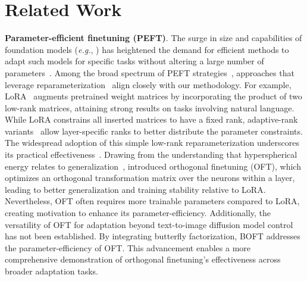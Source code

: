 \section{Related Work}

\textbf{Parameter-efficient finetuning (PEFT)}. The surge in size and capabilities of foundation models (\emph{e.g.}, \cite{brown2020language,radford2021learning,rombach2022high,kirillov2023segment}) has heightened the demand for efficient methods to adapt such models for specific tasks without altering a large number of parameters~\cite{treviso2023efficient,ding2023parameter,lialin2023scaling}. Among the broad spectrum of PEFT strategies~\cite{houlsby2019parameter,aghajanyan2020intrinsic,hulora2022,edalati2022krona,wang2022adamix,gheini2021cross,zaken2022bitfit,guo2020parameter,sung2021training,ansell2022composable,lester2021power,li2021prefix,vu2022spot,he2021towards,mao2021unipelt,karimi2021compacter,liu2022few,sung2022lst,chen2022parameter,jia2022visual,chen2022adaptformer,zhang2022neural,jie2023fact,lian2022scaling,luo2023towards}, approaches that leverage reparameterization~\cite{aghajanyan2020intrinsic,hulora2022,edalati2022krona} align closely with our methodology. For example, LoRA~\cite{hulora2022} augments pretrained weight matrices by incorporating the product of two low-rank matrices, attaining strong results on tasks involving natural language. While LoRA constrains all inserted matrices to have a fixed rank, adaptive-rank variants~\cite{zhang2022adaptive,valipour2022dylora,zhang2023increlora} allow layer-specific ranks to better distribute the parameter constraints. The widespread adoption of this simple low-rank reparameterization underscores its practical effectiveness~\cite{dettmers2023qlora,zi2023delta,chavan2023one}. Drawing from the understanding that hyperspherical energy relates to generalization~\cite{liu2018learning,liu2021orthogonal}, \cite{qiu2023controlling} introduced orthogonal finetuning (OFT), which optimizes an orthogonal transformation matrix over the neurons within a layer, leading to better generalization and training stability relative to LoRA. Nevertheless, OFT often requires more trainable parameters compared to LoRA, creating motivation to enhance its parameter-efficiency. Additionally, the versatility of OFT for adaptation beyond text-to-image diffusion model control~\cite{qiu2023controlling} has not been established. By integrating butterfly factorization, BOFT addresses the parameter-efficiency of OFT. This advancement enables a more comprehensive demonstration of orthogonal finetuning's effectiveness across broader adaptation tasks.

